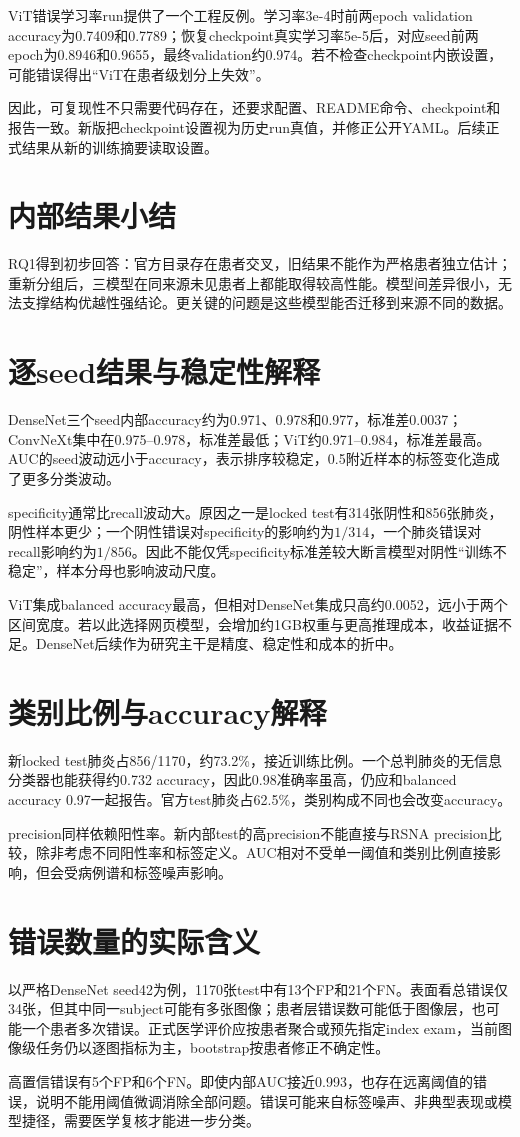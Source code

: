 ViT错误学习率run提供了一个工程反例。学习率3e-4时前两epoch validation accuracy为0.7409和0.7789；恢复checkpoint真实学习率5e-5后，对应seed前两epoch为0.8946和0.9655，最终validation约0.974。若不检查checkpoint内嵌设置，可能错误得出“ViT在患者级划分上失效”。

因此，可复现性不只需要代码存在，还要求配置、README命令、checkpoint和报告一致。新版把checkpoint设置视为历史run真值，并修正公开YAML。后续正式结果从新的训练摘要读取设置。

\section{内部结果小结}

RQ1得到初步回答：官方目录存在患者交叉，旧结果不能作为严格患者独立估计；重新分组后，三模型在同来源未见患者上都能取得较高性能。模型间差异很小，无法支撑结构优越性强结论。更关键的问题是这些模型能否迁移到来源不同的数据。

\section{逐seed结果与稳定性解释}

DenseNet三个seed内部accuracy约为0.971、0.978和0.977，标准差0.0037；ConvNeXt集中在0.975--0.978，标准差最低；ViT约0.971--0.984，标准差最高。AUC的seed波动远小于accuracy，表示排序较稳定，0.5附近样本的标签变化造成了更多分类波动。

specificity通常比recall波动大。原因之一是locked test有314张阴性和856张肺炎，阴性样本更少；一个阴性错误对specificity的影响约为$1/314$，一个肺炎错误对recall影响约为$1/856$。因此不能仅凭specificity标准差较大断言模型对阴性“训练不稳定”，样本分母也影响波动尺度。

ViT集成balanced accuracy最高，但相对DenseNet集成只高约0.0052，远小于两个区间宽度。若以此选择网页模型，会增加约1GB权重与更高推理成本，收益证据不足。DenseNet后续作为研究主干是精度、稳定性和成本的折中。

\section{类别比例与accuracy解释}

新locked test肺炎占856/1170，约73.2\%，接近训练比例。一个总判肺炎的无信息分类器也能获得约0.732 accuracy，因此0.98准确率虽高，仍应和balanced accuracy 0.97一起报告。官方test肺炎占62.5\%，类别构成不同也会改变accuracy。

precision同样依赖阳性率。新内部test的高precision不能直接与RSNA precision比较，除非考虑不同阳性率和标签定义。AUC相对不受单一阈值和类别比例直接影响，但会受病例谱和标签噪声影响。

\section{错误数量的实际含义}

以严格DenseNet seed42为例，1170张test中有13个FP和21个FN。表面看总错误仅34张，但其中同一subject可能有多张图像；患者层错误数可能低于图像层，也可能一个患者多次错误。正式医学评价应按患者聚合或预先指定index exam，当前图像级任务仍以逐图指标为主，bootstrap按患者修正不确定性。

高置信错误有5个FP和6个FN。即使内部AUC接近0.993，也存在远离阈值的错误，说明不能用阈值微调消除全部问题。错误可能来自标签噪声、非典型表现或模型捷径，需要医学复核才能进一步分类。
